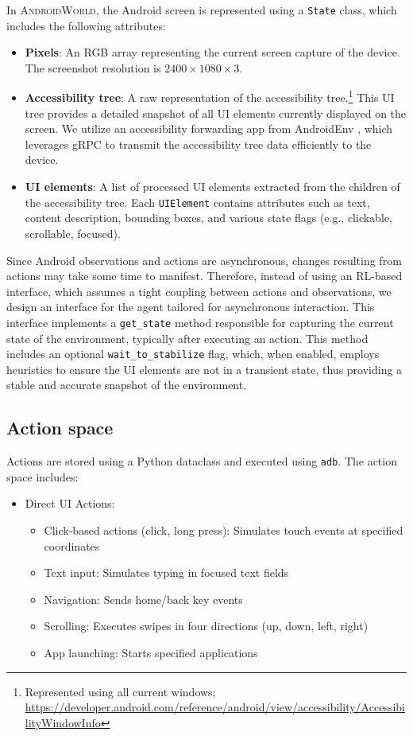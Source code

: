 \documentclass{article}
\newcommand{\system}{\textsc{AndroidWorld}\xspace}
\begin{document}
\begin{appendices}
In \system, the Android screen is represented using a \texttt{State} class, which includes the following attributes:
\begin{itemize}
\item \textbf{Pixels}: An RGB array representing the current screen capture of the device. The screenshot resolution is $2400 \times 1080 \times 3$.
\item \textbf{Accessibility tree}: A raw representation of the accessibility tree.\footnote{Represented using all current windows; \url{https://developer.android.com/reference/android/view/accessibility/AccessibilityWindowInfo}} This UI tree provides a detailed snapshot of all UI elements currently displayed on the screen. We utilize an accessibility forwarding app from AndroidEnv \citep{android_env}, which leverages gRPC to transmit the accessibility tree data efficiently to the device.
\item \textbf{UI elements}: A list of processed UI elements extracted from the children of the accessibility tree. Each \texttt{UIElement} contains attributes such as text, content description, bounding boxes, and various state flags (e.g., clickable, scrollable, focused).
\end{itemize}

Since Android observations and actions are asynchronous, changes resulting from actions may take some time to manifest. Therefore, instead of using an RL-based interface, which assumes a tight coupling between actions and observations, we design an interface for the agent tailored for asynchronous interaction. This interface implements a \texttt{get\_state} method responsible for capturing the current state of the environment, typically after executing an action. This method includes an optional \texttt{wait\_to\_stabilize} flag, which, when enabled, employs heuristics to ensure the UI elements are not in a transient state, thus providing a stable and accurate snapshot of the environment.

\subsection{Action space}

Actions are stored using a Python dataclass and executed using \texttt{adb}. The action space includes:

\begin{itemize}
\item Direct UI Actions:
    \begin{itemize}
    \item Click-based actions (click, long press): Simulates touch events at specified coordinates
    \item Text input: Simulates typing in focused text fields
    \item Navigation: Sends home/back key events
    \item Scrolling: Executes swipes in four directions (up, down, left, right)
    \item App launching: Starts specified applications
    \end{itemize}


\end{itemize}
\end{appendices}
\end{document}
